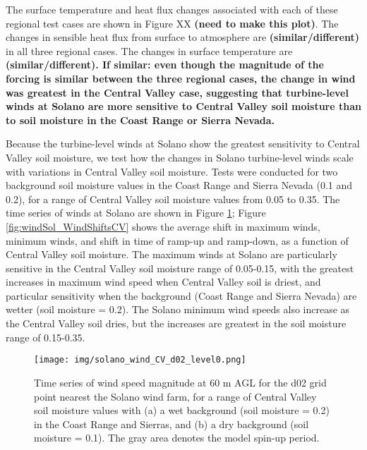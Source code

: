 The surface temperature and heat flux changes associated with each of these regional test cases are shown in Figure XX \textbf{(need to make this plot)}.  The changes in sensible heat flux from surface to atmosphere are \textbf{(similar/different)} in all three regional cases.  The changes in surface temperature are \textbf{(similar/different).  If similar: even though the magnitude of the forcing is similar between the three regional cases, the change in wind was greatest in the Central Valley case, suggesting that turbine-level winds at  Solano are more sensitive to Central Valley soil moisture than to soil moisture in the Coast Range or Sierra Nevada.}

Because the turbine-level winds at Solano show the greatest sensitivity to Central Valley soil moisture, we test how the changes in Solano turbine-level winds scale with variations in Central Valley soil moisture.  Tests were conducted for two background soil moisture values in the Coast Range and Sierra Nevada (0.1 and 0.2), for a range of Central Valley soil moisture values from 0.05 to 0.35.  The time series of winds at Solano are shown in Figure \ref{fig:windSol_TseriesWindCV}; Figure \ref{fig:windSol_WindShiftsCV} shows the average shift in maximum winds, minimum winds, and shift in time of ramp-up and ramp-down, as a function of Central Valley soil moisture.  The maximum winds at Solano are particularly sensitive in the Central Valley soil moisture range of 0.05-0.15, with the greatest increases in maximum wind speed when Central Valley soil is driest, and particular sensitivity when the background (Coast Range and Sierra Nevada) are wetter (soil moisture = 0.2).  The Solano minimum wind speeds also increase as the Central Valley soil dries, but the increases are greatest in the soil moisture range of 0.15-0.35.

\begin{figure}[here]
\texttt{[image: img/solano\_wind\_CV\_d02\_level0.png]}
\caption{Time series of wind speed magnitude at 60 m AGL for the d02 grid point nearest the Solano wind farm, for a range of Central Valley soil moisture values with (a) a wet background (soil moisture = 0.2) in the Coast Range and Sierras, and (b) a dry background (soil moisture = 0.1).  The gray area denotes the model spin-up period.}
\label{fig:windSol_TseriesWindCV}
\end{figure}

